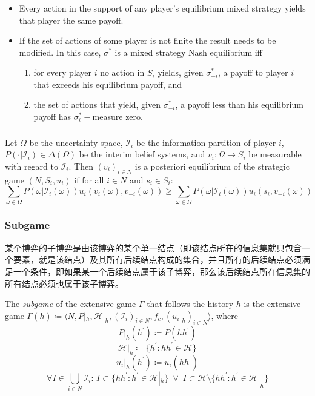 \documentclass[UTF8,11pt,colorlinks,compress,openany]{beamer}%
\begin{document}
\begin{frame}\frametitle{}
\begin{itemize}
	\item Every action in the support of any player's equilibrium mixed strategy yields that player the same payoff.
	\item If the set of actions of some player is not finite the result needs to be modified. In this case, $\sigma^*$ is a mixed strategy Nash equilibrium iff
	\begin{enumerate}
		\item for every player $i$ no action in $S_i$ yields, given $\sigma_{-i}^*$, a payoff to player $i$ that exceeds his equilibrium payoff, and
		\item the set of actions that yield, given $\sigma_{-i}^*$, a payoff less than his equilibrium payoff has $\sigma_i^*-$measure zero.
	\end{enumerate}
\end{itemize}
\end{frame}

\begin{frame}\frametitle{}
Let $\Omega$ be the uncertainty space, $\mathcal{I}_i$ be the information partition of player $i$, $P(\cdot|\mathcal{I}_i)\in\Delta(\Omega)$ be the interim belief systems, and $v_i: \Omega \to S_i$ be measurable with regard to $\mathcal{I}_i$. Then $(v_i)_{i\in N}$ is a posteriori equilibrium of the strategic game $(N,S_i,u_i)$ if for all $i\in N$ and $s_i\in S_i$:
\[\sum_{\omega \in \Omega}P(\omega|\mathcal{I}_i(\omega))u_i(v_i(\omega ),v_{-i}(\omega))\geq\sum_{\omega \in \Omega}P(\omega|\mathcal{I}_i(\omega))u_i\left(s_i,v_{-i}(\omega)\right)\]
\end{frame}

\begin{frame}\frametitle{Subgame}
某个博弈的子博弈是由该博弈的某个单一结点（即该结点所在的信息集就只包含一个要素，就是该结点）及其所有后续结点构成的集合，并且所有的后续结点必须满足一个条件，即如果某一个后续结点属于该子博弈，那么该后续结点所在信息集的所有结点必须也属于该子博弈。
\begin{definition}[Subgame]
	The \emph{subgame} of the extensive game $\Gamma$ that follows the history $h$
	is the extensive game $\Gamma(h)\coloneqq \langle N,P|_h,\mathcal{H}|_h,(\mathcal{I}_i)_{i\in N},f_c,(u_i|_h)_{i\in N}\rangle$, where
	\[P|_h(h^\prime)\coloneqq P(hh^\prime)\]
	\[\mathcal{H}|_h\coloneqq \{h^\prime:hh^\prime\in\mathcal{H}\}\]
	\[u_i|_h(h^\prime)\coloneqq u_i(hh^\prime)\]
	\[\forall I\in\bigcup\limits_{i\in N}\mathcal{I}_i:\,I\subset\{hh^\prime:h^\prime\in\mathcal{H}|_h\}\;\vee\;I\subset\mathcal{H}\setminus \{hh^\prime:h^\prime\in\mathcal{H}|_h\}\]
\end{definition}	
\end{frame}
\end{document}
